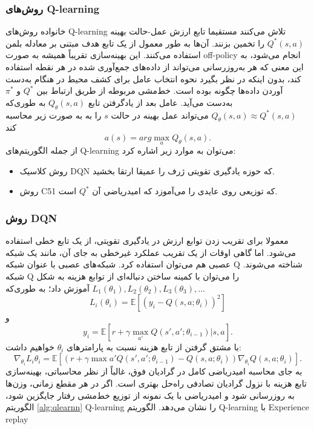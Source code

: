  \subsubsection{روش‌های Q-learning}

خانواده روش‌های  Q-learning تلاش می‌کنند مستقیما تابع ارزش عمل-حالت بهینه $Q^*(s,a)$ را تخمین بزنند. آن‌ها به طور معمول از یک تابع هدف مبتنی بر معادله بلمن استفاده می‌کنند. این بهینه‌سازی تقریباً همیشه به صورت off-policy انجام می‌شود، به این معنی که هر به‌روزرسانی می‌تواند از داده‌های جمع‌آوری شده در هر نقطه استفاده کند، بدون اینکه در نظر بگیرد نحوه انتخاب عامل برای کشف محیط در هنگام به‌دست آوردن داده‌ها چگونه بوده است. خط‌مشی مربوطه از طریق ارتباط بین 
$Q^*$
و
$\pi^*$
 به‌دست می‌آید. 
 عامل بعد از یادگرفتن تابع $Q_\theta(s,a)$ به طوری‌که  $Q_\theta(s,a) \approx Q^*(s,a)$ می‌تواند عمل بهینه در حالت $s$ را به به صورت زیر محاسبه کند $$a(s) = arg \max_a Q_{\theta}(s,a).$$
از جمله الگوریتم‌های Q-learning می‌توان به موارد زیر اشاره کرد:
\begin{itemize}
\item روش کلاسیک DQN که حوزه یادگیری تقویتی ژرف را عمیقا ارتقا بخشید.
\item روش C51 که توزیعی روی عایدی را می‌آموزد که امیدریاضی آن $Q^*$ است.
\end{itemize}
\subsubsection{روش DQN}
معمولا برای تقریب زدن توابع ارزش در یادگیری تقویتی، از یک تابع خطی استفاده می‌شود.
اما گاهی اوقات از یک تقریب عملکرد غیرخطی به جای آن، مانند یک شبکه عصبی هم می‌توان استفاده کرد. شبکه‌های عصبی با عنوان شبکه Q شناخته می‌شوند.
شبکه Q را می‌توان با کمینه ساختن دنباله‌ای از توابع هزینه به شکل 
$L_1(\theta_1), L_2(\theta_2), L_3(\theta_3), ... $ آموزش داد؛ به طوری‌که
$$L_i(\theta_i)=\mathbb{E}\left[(y_i - Q(s,a;\theta_i))^2\right]$$  و  $$y_i = \mathbb{E}[r + \gamma \max_{a'} Q(s',a'; \theta_{i-1})| s,a].$$ با مشتق گرفتن از تابع هزینه نسبت به پارامترهای $\theta_i$  خواهیم داشت: $$\nabla_{\theta_i} L_i{\theta_i} = \mathbb{E}\left[ \left(r + \gamma \max{a'} Q(s',a';\theta_{i-1}) - Q(s,a;\theta_i)\right) \nabla_{\theta_i} Q(s,a;\theta_i)\right].$$
به جای محاسبه امیدریاضی کامل در گرادیان فوق، غالباً از نظر محاسباتی، بهینه‌سازی تابع هزینه با نزول گرادیان تصادفی   راه‌حل بهتری است. اگر در هر مقطع زمانی، وزن‌ها به روزرسانی شود و امیدریاضی با یک نمونه از توزیع خط‌مشی رفتار  جایگزین شود، الگوریتم
\ref{alg:qlearnn}
 Q-learning را نشان می‌دهد.
{الگوریتم Q-learning با Experience replay}

